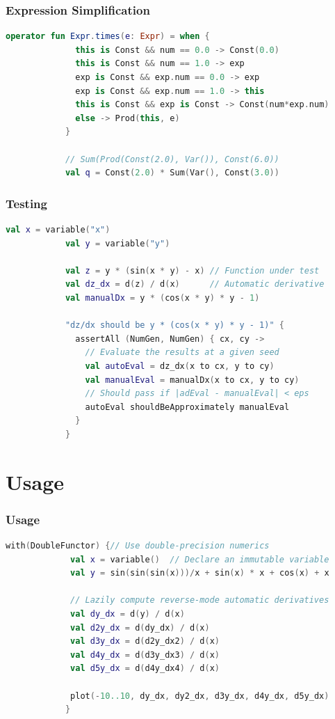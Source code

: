\documentclass{beamer}
\begin{document}
    \begin{frame}[fragile]
        \frametitle{Expression Simplification}
        \begin{lstlisting}[language=Kotlin, gobble=12]
            operator fun Expr.times(e: Expr) = when {
              this is Const && num == 0.0 -> Const(0.0)
              this is Const && num == 1.0 -> exp
              exp is Const && exp.num == 0.0 -> exp
              exp is Const && exp.num == 1.0 -> this
              this is Const && exp is Const -> Const(num*exp.num)
              else -> Prod(this, e)
            }

            // Sum(Prod(Const(2.0), Var()), Const(6.0))
            val q = Const(2.0) * Sum(Var(), Const(3.0))
        \end{lstlisting}
    \end{frame}

    \begin{frame}[fragile]
        \frametitle{Testing}
        \begin{lstlisting}[language=Kotlin, gobble=12]
            val x = variable("x")
            val y = variable("y")

            val z = y * (sin(x * y) - x) // Function under test
            val dz_dx = d(z) / d(x)      // Automatic derivative
            val manualDx = y * (cos(x * y) * y - 1)

            "dz/dx should be y * (cos(x * y) * y - 1)" {
              assertAll (NumGen, NumGen) { cx, cy ->
                // Evaluate the results at a given seed
                val autoEval = dz_dx(x to cx, y to cy)
                val manualEval = manualDx(x to cx, y to cy)
                // Should pass if |adEval - manualEval| < eps
                autoEval shouldBeApproximately manualEval
              }
            }
        \end{lstlisting}
    \end{frame}

    \section{Usage}\label{sec:fourth-section}

    \begin{frame}[fragile]
        \frametitle{Usage}
        \begin{lstlisting}[language=Kotlin, gobble=12]
            with(DoubleFunctor) {// Use double-precision numerics
             val x = variable()  // Declare an immutable variable
             val y = sin(sin(sin(x)))/x + sin(x) * x + cos(x) + x

             // Lazily compute reverse-mode automatic derivatives
             val dy_dx = d(y) / d(x)
             val d2y_dx = d(dy_dx) / d(x)
             val d3y_dx = d(d2y_dx2) / d(x)
             val d4y_dx = d(d3y_dx3) / d(x)
             val d5y_dx = d(d4y_dx4) / d(x)

             plot(-10..10, dy_dx, dy2_dx, d3y_dx, d4y_dx, d5y_dx)
            }
        \end{lstlisting}
    \end{frame}
\end{document}
